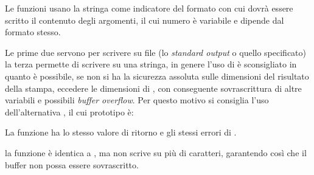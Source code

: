 Le funzioni usano la stringa  come indicatore del formato con
cui dovrà essere scritto il contenuto degli argomenti, il cui numero è
variabile e dipende dal formato stesso.

Le prime due servono per scrivere su file (lo \textit{standard output} o
quello specificato) la terza permette di scrivere su una stringa, in genere
l'uso di  è sconsigliato in quanto è possibile, se non si ha la
sicurezza assoluta sulle dimensioni del risultato della stampa, eccedere le
dimensioni di , con conseguente sovrascrittura di altre variabili e
possibili \textit{buffer overflow}. Per questo motivo si consiglia l'uso
dell'alternativa , il cui prototipo è:

\begin{funcproto}{
}

{La funzione ha lo stesso valore di ritorno e gli stessi errori di
  .}
\end{funcproto}

\noindent la funzione è identica a , ma non scrive
su  più di  caratteri, garantendo così che il buffer
non possa essere sovrascritto.

